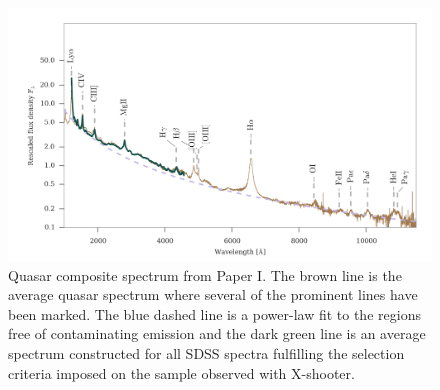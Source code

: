 \begin{figure}[htb]
	\includegraphics[width=\textwidth]{gfx/qsospec}
	\caption{Quasar composite spectrum from Paper I. The brown line is the average
quasar spectrum where several of the prominent lines have been marked. The blue
dashed line is a power-law fit to the regions free of contaminating emission and
 the dark green line is an average spectrum constructed for all SDSS spectra
fulfilling the selection criteria imposed on the sample observed with
X-shooter.}
	
	\label{fig:intro:qsospec}
\end{figure}



